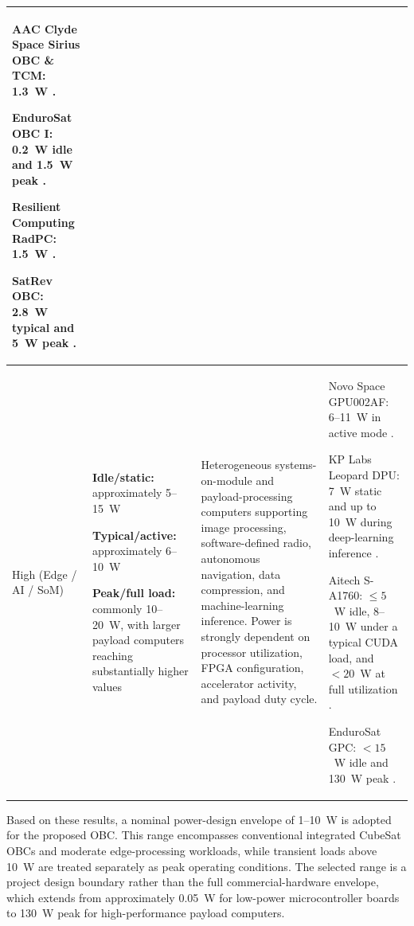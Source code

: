 \documentclass[10pt]{../datasheet}
\let\cite\citep
\begin{document}
\begin{longtable}{|p{2.7cm}|p{3.2cm}|p{5.0cm}|p{5.4cm}|}
  AAC Clyde Space Sirius OBC \& TCM:
  1.3~W
  \cite[p.~228]{nasa_soa_2023}
  \cite[p.~230]{nasa_soa_2024}
  \cite[Table~8-4]{nasa_soa_2026}.

  EnduroSat OBC I:
  0.2~W idle and 1.5~W peak
  \cite[p.~229]{nasa_soa_2023}
  \cite[Table~8-1]{nasa_soa_2024}
  \cite[p.~230]{nasa_soa_2026}.

  Resilient Computing RadPC:
  1.5~W
  \cite[p.~232]{nasa_soa_2023}
  \cite[p.~236]{nasa_soa_2024}
  \cite[p.~233]{nasa_soa_2026}.

  SatRev OBC:
  2.8~W typical and 5~W peak
  \cite[p.~233]{nasa_soa_2026}.
  \\ \hline

  High
  (Edge / AI / SoM)
   &
  \textbf{Idle/static:} approximately 5--15~W

  \textbf{Typical/active:} approximately 6--10~W

  \textbf{Peak/full load:} commonly 10--20~W, with larger payload
  computers reaching substantially higher values
   &
  Heterogeneous systems-on-module and payload-processing computers supporting
  image processing, software-defined radio, autonomous navigation, data
  compression, and machine-learning inference. Power is strongly dependent on
  processor utilization, FPGA configuration, accelerator activity, and
  payload duty cycle.
   &
  Novo Space GPU002AF:
  6--11~W in active mode
  \cite[p.~231]{nasa_soa_2023}
  \cite[p.~235]{nasa_soa_2024}
  \cite[p.~233]{nasa_soa_2026}.

  KP Labs Leopard DPU:
  7~W static and up to 10~W during deep-learning inference
  \cite[p.~230]{nasa_soa_2023}
  \cite[p.~234]{nasa_soa_2024}
  \cite[p.~231]{nasa_soa_2026}.

  Aitech S-A1760:
  $\leq5$~W idle, 8--10~W under a typical CUDA load, and
  $<20$~W at full utilization
  \cite[p.~228]{nasa_soa_2023}
  \cite[Table~8-1]{nasa_soa_2024}
  \cite[Table~8-4]{nasa_soa_2026}.

  EnduroSat GPC:
  $<15$~W idle and 130~W peak
  \cite[p.~231]{nasa_soa_2026}.
  \\ \hline
\end{longtable}

Based on these results, a nominal power-design envelope of 1--10~W is adopted
for the proposed OBC. This range encompasses conventional integrated CubeSat
OBCs and moderate edge-processing workloads, while transient loads above 10~W
are treated separately as peak operating conditions. The selected range is a
project design boundary rather than the full commercial-hardware envelope, which
extends from approximately 0.05~W for low-power microcontroller boards to 130~W
peak for high-performance payload computers.
\end{document}
